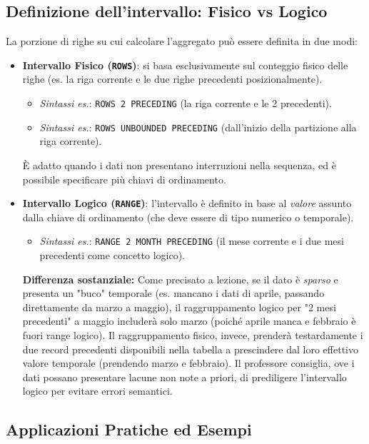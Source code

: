 \subsection{Definizione dell'intervallo: Fisico vs Logico}
La porzione di righe su cui calcolare l'aggregato può essere definita in due modi:
\begin{itemize}
    \item \textbf{Intervallo Fisico (\texttt{ROWS})}: si basa esclusivamente sul conteggio fisico delle righe (es. la riga corrente e le due righe precedenti posizionalmente). 
    \begin{itemize}
        \item \textit{Sintassi es.}: \texttt{ROWS 2 PRECEDING} (la riga corrente e le 2 precedenti).
        \item \textit{Sintassi es.}: \texttt{ROWS UNBOUNDED PRECEDING} (dall'inizio della partizione alla riga corrente).
    \end{itemize}
    È adatto quando i dati non presentano interruzioni nella sequenza, ed è possibile specificare più chiavi di ordinamento.
    
    \item \textbf{Intervallo Logico (\texttt{RANGE})}: l'intervallo è definito in base al \textit{valore} assunto dalla chiave di ordinamento (che deve essere di tipo numerico o temporale). 
    \begin{itemize}
        \item \textit{Sintassi es.}: \texttt{RANGE 2 MONTH PRECEDING} (il mese corrente e i due mesi precedenti come concetto logico).
    \end{itemize}
    \textbf{Differenza sostanziale:} Come precisato a lezione, se il dato è \textit{sparso} e presenta un "buco" temporale (es. mancano i dati di aprile, passando direttamente da marzo a maggio), il raggruppamento logico per "2 mesi precedenti" a maggio includerà solo marzo (poiché aprile manca e febbraio è fuori range logico). Il raggruppamento fisico, invece, prenderà testardamente i due record precedenti disponibili nella tabella a prescindere dal loro effettivo valore temporale (prendendo marzo e febbraio). Il professore consiglia, ove i dati possano presentare lacune non note a priori, di prediligere l'intervallo logico per evitare errori semantici.
\end{itemize}

\subsection{Applicazioni Pratiche ed Esempi}

